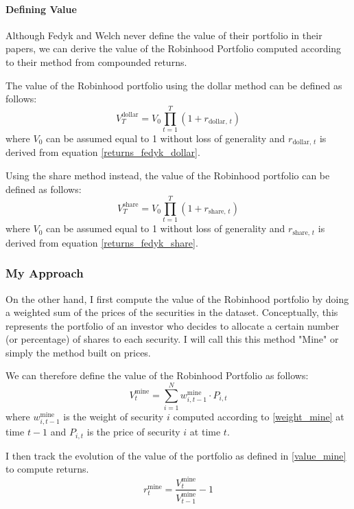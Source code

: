 \paragraph{Defining Value}
Although Fedyk and Welch never define the value of their portfolio in their papers, 
we can derive the value of the Robinhood Portfolio computed according to their method from compounded returns.

The value of the Robinhood portfolio using the dollar method can be defined as follows:
\begin{equation}
    V^{\text{dollar}}_T = V_0 \prod_{t=1}^{T}\left( 1+r_{\text{dollar},\,t} \right)
\end{equation}   
where $V_0$ can be assumed equal to 1 without loss of generality and $r_{\text{dollar},\,t}$ is derived from equation \ref{returns_fedyk_dollar}.

Using the share method instead, the value of the Robinhood portfolio can be defined as follows:
\begin{equation}
    V^{\text{share}}_T = V_0 \prod_{t=1}^{T}\left( 1+r_{\text{share},\,t} \right)
\end{equation}   
where $V_0$ can be assumed equal to 1 without loss of generality and $r_{\text{share},\,t}$ is derived from equation \ref{returns_fedyk_share}.

\subsubsection{My Approach}
On the other hand, I first compute the value of the Robinhood portfolio by doing a weighted sum of the prices of the securities in the dataset.
Conceptually, this represents the portfolio of an investor who decides to allocate a certain number (or percentage) of shares to each security.
I will call this this method "Mine" or simply the method built on prices.

We can therefore define the value of the Robinhood Portfolio as follows:
\begin{equation}
    V^{\text{mine}}_t = \sum_{i=1}^N w^{\text{mine}}_{i,t-1}\cdot P_{i,t}
    \label{value_mine}
\end{equation}
where $w^{\text{mine}}_{i,t-1}$ is the weight of security $i$ computed according to \ref{weight_mine} at time $t-1$ and $P_{i,t}$ is the price of security $i$ at time $t$.

I then track the evolution of the value of the portfolio as defined in \ref{value_mine} to compute returns. 
\begin{equation}
    r^{\text{mine}}_t = \frac{V^{\text{mine}}_t}{V^{\text{mine}}_{t-1}} - 1
\label{returns_mine}
\end{equation}

